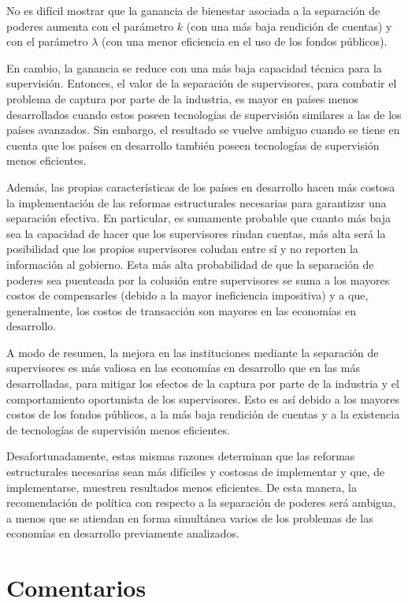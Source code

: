 \documentclass[
  12pt,
  spanish,
]{book}
\begin{document}
No es difícil mostrar que la ganancia de bienestar asociada a la
separación de poderes aumenta con el parámetro \(k\) (con una más baja
rendición de cuentas) y con el parámetro \(λ\) (con una menor eficiencia
en el uso de los fondos públicos).

En cambio, la ganancia se reduce con una más baja capacidad técnica para
la supervisión. Entonces, el valor de la separación de supervisores,
para combatir el problema de captura por parte de la industria, es mayor
en países menos desarrollados cuando estos poseen tecnologías de
supervisión similares a las de los países avanzados. Sin embargo, el
resultado se vuelve ambiguo cuando se tiene en cuenta que los países en
desarrollo también poseen tecnologías de supervisión menos eficientes.

Además, las propias características de los países en desarrollo hacen
más costosa la implementación de las reformas estructurales necesarias
para garantizar una separación efectiva. En particular, es sumamente
probable que cuanto más baja sea la capacidad de hacer que los
supervisores rindan cuentas, más alta será la posibilidad que los
propios supervisores coludan entre sí y no reporten la información al
gobierno. Esta más alta probabilidad de que la separación de poderes sea
puenteada por la colusión entre supervisores se suma a los mayores
costos de compensarles (debido a la mayor ineficiencia impositiva) y a
que, generalmente, los costos de transacción son mayores en las
economías en desarrollo.

A modo de resumen, la mejora en las instituciones mediante la separación
de supervisores es más valiosa en las economías en desarrollo que en las
más desarrolladas, para mitigar los efectos de la captura por parte de
la industria y el comportamiento oportunista de los supervisores. Esto
es así debido a los mayores costos de los fondos públicos, a la más baja
rendición de cuentas y a la existencia de tecnologías de supervisión
menos eficientes.

Desafortunadamente, estas mismas razones determinan que las reformas
estructurales necesarias sean más difíciles y costosas de implementar y
que, de implementarse, muestren resultados menos eficientes. De esta
manera, la recomendación de política con respecto a la separación de
poderes será ambigua, a menos que se atiendan en forma simultánea varios
de los problemas de las economías en desarrollo previamente analizados.

\hypertarget{coment-fin}{%
\section{Comentarios}\label{coment-fin}}
\end{document}
